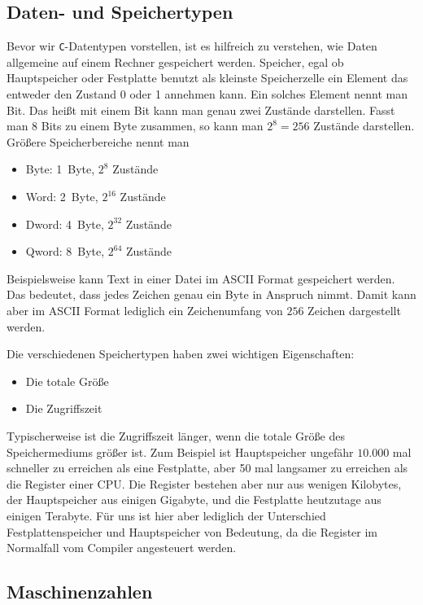 \subsection{Daten- und Speichertypen}

Bevor wir \texttt{C}-Datentypen vorstellen, ist es hilfreich zu verstehen, wie Daten allgemeine auf einem Rechner gespeichert werden.
Speicher, egal ob Hauptspeicher oder Festplatte benutzt als kleinste Speicherzelle ein Element das entweder den Zustand 0 oder 1 annehmen kann.
Ein solches Element nennt man Bit.
Das heißt mit einem Bit kann man genau zwei Zustände darstellen.
Fasst man 8 Bits zu einem Byte zusammen, so kann man $2^8=256$ Zustände darstellen.
Größere Speicherbereiche nennt man
\begin{itemize}
\item Byte:  1~Byte, $2^{8 }$ Zustände
\item Word:  2~Byte, $2^{16}$ Zustände
\item Dword: 4~Byte, $2^{32}$ Zustände
\item Qword: 8~Byte, $2^{64}$ Zustände
\end{itemize}
Beispielsweise kann Text in einer Datei im ASCII Format gespeichert werden. 
Das bedeutet, dass jedes Zeichen genau ein Byte in Anspruch nimmt.
Damit kann aber im ASCII Format lediglich ein Zeichenumfang von $256$ Zeichen dargestellt werden.

Die verschiedenen Speichertypen haben zwei wichtigen Eigenschaften:
\begin{itemize}
\item Die totale Größe
\item Die Zugriffszeit
\end{itemize}
Typischerweise ist die Zugriffszeit länger, wenn die totale Größe des Speichermediums größer ist.
Zum Beispiel ist Hauptspeicher ungefähr $10.000$ mal schneller zu erreichen als eine Festplatte, aber 50 mal langsamer zu erreichen als die Register einer CPU.
Die Register bestehen aber nur aus wenigen Kilobytes, der Hauptspeicher aus einigen Gigabyte, und die Festplatte heutzutage aus einigen Terabyte.
Für uns ist hier aber lediglich der Unterschied Festplattenspeicher und Hauptspeicher von Bedeutung, da die Register im Normalfall vom Compiler angesteuert werden.

\subsection{Maschinenzahlen}

